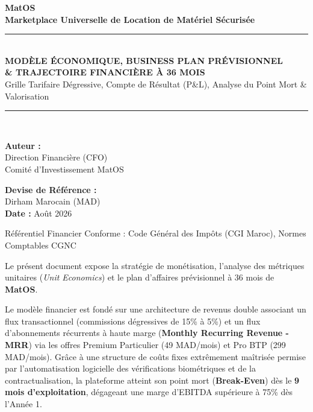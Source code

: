 \documentclass[11pt,a4paper]{report}
\begin{document}
\begin{titlepage}
    \centering
    \vspace*{1.5cm}
    {\Huge\bfseries\color{primaryNavy} MatOS}\\[0.4cm]
    {\LARGE\bfseries\color{accentTeal} Marketplace Universelle de Location de Matériel Sécurisée}\\[1.5cm]
    
    \rule{\linewidth}{1.8pt}\\[0.4cm]
    {\huge\bfseries MODÈLE ÉCONOMIQUE, BUSINESS PLAN PRÉVISIONNEL\\\& TRAJECTOIRE FINANCIÈRE À 36 MOIS}\\[0.3cm]
    {\large Grille Tarifaire Dégressive, Compte de Résultat (P\&L), Analyse du Point Mort \& Valorisation}\\[0.4cm]
    \rule{\linewidth}{1.8pt}\\[2.2cm]
    
    \begin{minipage}{0.45\textwidth}
        \begin{flushleft} \large
            \textbf{Auteur :}\\
            Direction Financière (CFO)\\
            Comité d'Investissement MatOS
        \end{flushleft}
    \end{minipage}
    \hfill
    \begin{minipage}{0.45\textwidth}
        \begin{flushright} \large
            \textbf{Devise de Référence :}\\
            Dirham Marocain (MAD)\\
            \textbf{Date :} Août 2026
        \end{flushright}
    \end{minipage}
    
    \vfill
    {\small Référentiel Financier Conforme : Code Général des Impôts (CGI Maroc), Normes Comptables CGNC}
\end{titlepage}

\tableofcontents
\newpage

\begin{tcolorbox}[execbox]
Le présent document expose la stratégie de monétisation, l'analyse des métriques unitaires (\textit{Unit Economics}) et le plan d'affaires prévisionnel à 36 mois de \textbf{MatOS}.

Le modèle financier est fondé sur une architecture de revenus double associant un flux transactionnel (commissions dégressives de 15\% à 5\%) et un flux d'abonnements récurrents à haute marge (\textbf{Monthly Recurring Revenue - MRR}) via les offres Premium Particulier (49 MAD/mois) et Pro BTP (299 MAD/mois). Grâce à une structure de coûts fixes extrêmement maîtrisée permise par l'automatisation logicielle des vérifications biométriques et de la contractualisation, la plateforme atteint son point mort (\textbf{Break-Even}) dès le \textbf{9\ieme{} mois d'exploitation}, dégageant une marge d'EBITDA supérieure à 75\% dès l'Année 1.
\end{tcolorbox}
\end{document}
